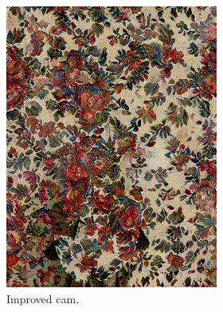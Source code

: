 \begin{figure}[]
\begin{subfigure}{\textwidth}
\begin{subfigure}{0.24\textwidth}
            \includegraphics[width=\textwidth]{images/04-experiment02/human/flowers/improved_proj.jpg}
            \caption*{Improved cam.}
        \end{subfigure}
        \hfill
        \begin{subfigure}{0.24\textwidth}
            \centering

\end{subfigure}
\end{subfigure}
\end{figure}
